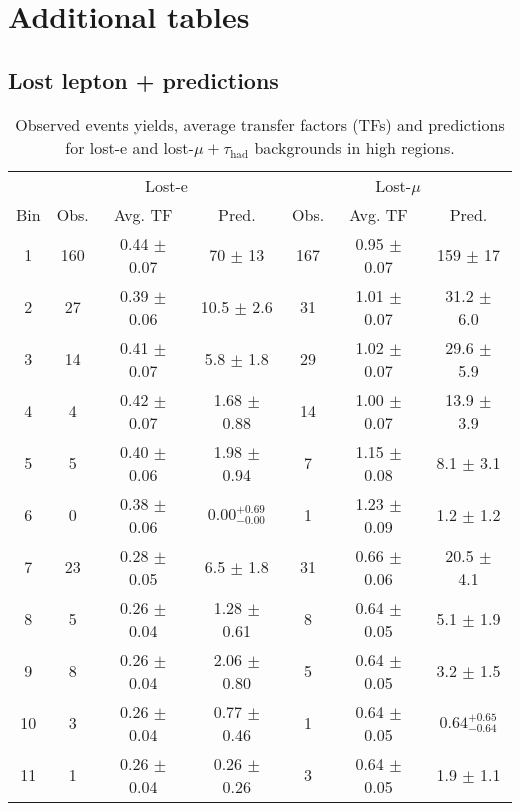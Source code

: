 \chapter{Additional tables} %

\label{AppendixB}
\section{Lost lepton + \tauh predictions}
\begin{table}[h!]
\centering
\caption{Observed events yields, average transfer factors (TFs) and predictions for lost-e and 
lost-$\mu+\tau_{\text{had}}$ backgrounds in high \dphi regions.}
\label{tab:lostLeptonPredictions}
\begin{tabular}{c|c|c|c|c|c|c}
\hline
     &  \multicolumn{3}{c}{Lost-e} & \multicolumn{3}{c}{Lost-$\mu$} \\\cline{2-7}
Bin & Obs. & Avg. TF & Pred. & Obs. & Avg. TF &  Pred. \\ 
\hline \hline
1 & 160  & 0.44  $\pm$  0.07  & 70 $\pm$ 13 & 167  & 0.95  $\pm$  0.07  & 159 $\pm$ 17     \\\hline
2 & 27  & 0.39  $\pm$  0.06  & 10.5 $\pm$ 2.6 & 31  & 1.01  $\pm$  0.07  & 31.2 $\pm$ 6.0     \\\hline
3 & 14  & 0.41  $\pm$  0.07  & 5.8 $\pm$ 1.8 & 29  & 1.02  $\pm$  0.07  & 29.6 $\pm$ 5.9     \\\hline
4 & 4  & 0.42  $\pm$  0.07  & 1.68 $\pm$ 0.88 & 14  & 1.00  $\pm$  0.07  & 13.9 $\pm$ 3.9     \\\hline
5 & 5  & 0.40  $\pm$  0.06  & 1.98 $\pm$ 0.94 & 7  & 1.15  $\pm$  0.08  & 8.1 $\pm$ 3.1     \\\hline
6 & 0  & 0.38  $\pm$  0.06  & $0.00 _{-0.00}^{+0.69}$ & 1  & 1.23  $\pm$  0.09  & 1.2 $\pm$ 1.2     \\\hline
7 & 23  & 0.28  $\pm$  0.05  & 6.5 $\pm$ 1.8 & 31  & 0.66  $\pm$  0.06  & 20.5 $\pm$ 4.1     \\\hline
8 & 5  & 0.26  $\pm$  0.04  & 1.28 $\pm$ 0.61 & 8  & 0.64  $\pm$  0.05  & 5.1 $\pm$ 1.9     \\\hline
9 & 8  & 0.26  $\pm$  0.04  & 2.06 $\pm$ 0.80 & 5  & 0.64  $\pm$  0.05  & 3.2 $\pm$ 1.5     \\\hline
10 & 3  & 0.26  $\pm$  0.04  & 0.77 $\pm$ 0.46 & 1  & 0.64  $\pm$  0.05  & $0.64^{+0.65}_{-0.64}$     \\\hline
11 & 1  & 0.26  $\pm$  0.04  & 0.26 $\pm$ 0.26 & 3  & 0.64  $\pm$  0.05  & 1.9 $\pm$ 1.1     \\\hline

\end{tabular}
\end{table}

